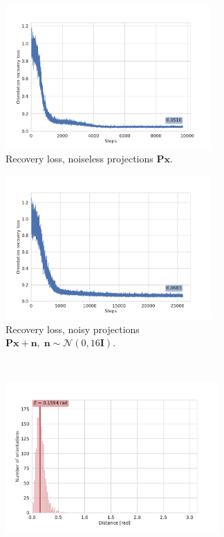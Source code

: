 \begin{figure}[ht!]
    \centering
    \begin{subfigure}[b]{0.45\textwidth}
        \includegraphics[height=5.5cm]{figures/5j0n_noise0_angle_recovery}
        \caption{Recovery loss, noiseless projections $\mathbf{Px}$.}
    \end{subfigure}
    \hfill
    \begin{subfigure}[b]{0.5\textwidth}
    \centering
        \includegraphics[height=5.5cm]{figures/5j0n_noise16_angle_recovery}
        \caption{Recovery loss, noisy projections $\mathbf{Px+n}, \; \mathbf{n} \sim \mathcal{N}(0, 16\mathbf{I})$.}
    \end{subfigure}
    \\
    \begin{subfigure}[b]{0.45\textwidth}
    \centering
        \includegraphics[height=5.7cm]{figures/5j0n_noise0_angle_alignment_after}

\end{subfigure}
\end{figure}
